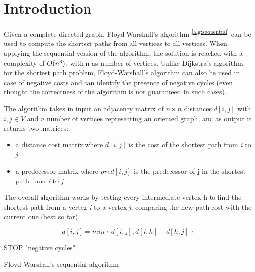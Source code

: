 \section{Introduction}\label{introduction}

Given a complete directed  graph, Floyd-Warshall's algorithm \textsuperscript{\ref{alg:sequential}} can be used to compute the shortest paths from all vertices to all vertices.
When applying the sequential version of the algorithm, the solution is reached with a complexity of $O(n\textsuperscript{3})$, with n as number of vertices.
Unlike Dijkstra's algorithm for the shortest path problem, Floyd-Warshall's algorithm can also be used in case of negative costs and can identify the presence of negative cycles 
(even thought the correctness of the algorithm is not guaranteed in such cases).

\cite{fischetti}
The algorithm takes in input an adjacency matrix of $n \times n$  distances $d[i,j]$ with $i,j \in V$ and $n$ number of vertices representing an oriented graph, and as output it returns two matrices:
\begin{itemize}
    \item a distance cost matrix where $d[i,j]$ is the cost of the shortest path from \textit{i} to \textit{j}
    \item a predecessor matrix where $pred[i,j]$ is the predecessor of j in the shortest path from \textit{i} to \textit{j}
  \end{itemize}

The overall algorithm works by testing every intermediate vertex h to find the shortest path from a vertex \textit{i} to a vertex \textit{j},
comparing the new path cost with the current one (best so far).

\begin{equation}
    d[i,j] = min\left\{ d[i,j], d[i,h]+d[h,j] \right\}
\end{equation}



\begin{algorithm}
     {
         {
        }
         {
             {
                STOP  "negative cycles"
            }
        }
    }
\caption{Floyd-Warshall's sequential algorithm}
\label{alg:sequential}
\end{algorithm}



